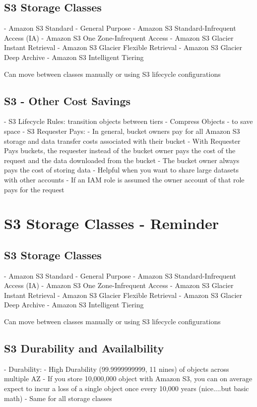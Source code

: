 \documentclass[11pt]{book}
\begin{document}
    \subsection{S3 Storage Classes}
    - Amazon S3 Standard - General Purpose
    - Amazon S3 Standard-Infrequent Access (IA)
    - Amazon S3 One Zone-Infrequent Access
    - Amazon S3 Glacier Instant Retrieval
    - Amazon S3 Glacier Flexible Retrieval
    - Amazon S3 Glacier Deep Archive
    - Amazon S3 Intelligent Tiering

    Can move between classes manually or using S3 lifecycle configurations

    \subsection{S3 - Other Cost Savings}
    - S3 Lifecycle Rules: transition objects between tiers
    - Compress Objects - to save space
    - S3 Requester Pays:
    - In general, bucket owners pay for all Amazon S3 storage and data transfer costs associated with their bucket
    - With Requester Pays buckets, the requester instead of the bucket owner pays the cost of the request and the data downloaded from the bucket
    - The bucket owner always pays the cost of storing data
    - Helpful when you want to share large datasets with other accounts
    - If an IAM role is assumed the owner account of that role pays for the request


    \section{S3 Storage Classes - Reminder}

    \subsection{S3 Storage Classes}
    - Amazon S3 Standard - General Purpose
    - Amazon S3 Standard-Infrequent Access (IA)
    - Amazon S3 One Zone-Infrequent Access
    - Amazon S3 Glacier Instant Retrieval
    - Amazon S3 Glacier Flexible Retrieval
    - Amazon S3 Glacier Deep Archive
    - Amazon S3 Intelligent Tiering

    Can move between classes manually or using S3 lifecycle configurations

    \subsection{S3 Durability and Availalbility}
    - Durability:
    - High Durability (99.9999999999, 11 nines) of objects across multiple AZ
    - If you store 10,000,000 object with Amazon S3, you can on average expect to incur a loss of a single object once every 10,000 years (nice....but basic math)
    - Same for all storage classes
\end{document}
